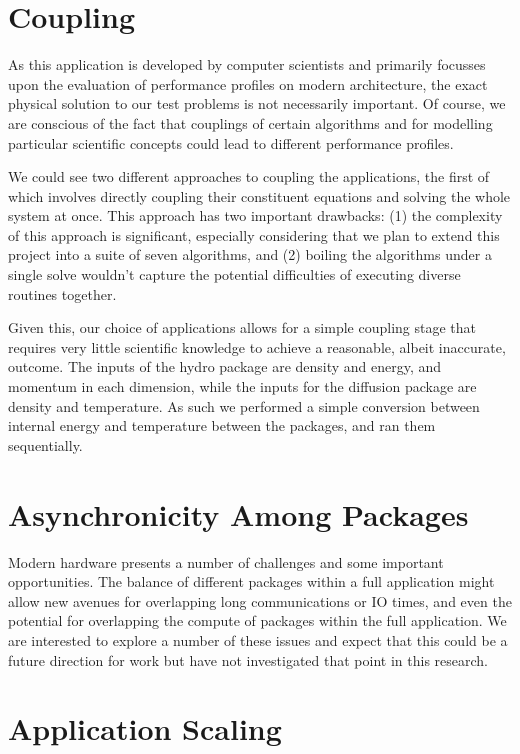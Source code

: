 \documentclass[runningheads,a4paper]{llncs}
\begin{document}
\section{Coupling}

As this application is developed by computer scientists and primarily focusses upon the evaluation of performance profiles on modern architecture, the exact physical solution to our test problems is not necessarily important. Of course, we are conscious of the fact that couplings of certain algorithms and for modelling particular scientific concepts could lead to different performance profiles.

We could see two different approaches to coupling the applications, the first of which involves directly coupling their constituent equations and solving the whole system at once. This approach has two important drawbacks: (1) the complexity of this approach is significant, especially considering that we plan to extend this project into a suite of seven algorithms, and (2) boiling the algorithms under a single solve wouldn't capture the potential difficulties of executing diverse routines together.

Given this, our choice of applications allows for a simple coupling stage that requires very little scientific knowledge to achieve a reasonable, albeit inaccurate, outcome. The inputs of the hydro package are density and energy, and momentum in each dimension, while the inputs for the diffusion package are density and temperature. As such we performed a simple conversion between internal energy and temperature between the packages, and ran them sequentially.

\section{Asynchronicity Among Packages}

Modern hardware presents a number of challenges and some important opportunities. The balance of different packages within a full application might allow new avenues for overlapping long communications or IO times, and even the potential for overlapping the compute of packages within the full application. We are interested to explore a number of these issues and expect that this could be a future direction for work but have not investigated that point in this research.

\section{Application Scaling}
\end{document}
